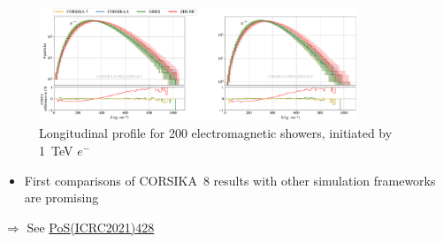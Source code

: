 \begin{frame}[c]
    \begin{figure}
        \centering
        \includegraphics[width=0.85\textwidth]{plots/longitudinal_profile.pdf}
        \caption*{Longitudinal profile for 200 electromagnetic showers, initiated by \SI{1}{\tera\electronvolt} $e^-$}
    \end{figure}
    \begin{itemize}
        \item First comparisons of CORSIKA~8 results with other simulation frameworks are promising
    \end{itemize}

    \hspace{20pt} $\Rightarrow$ See \href{https://pos.sissa.it/395/428/}{PoS(ICRC2021)428}

\end{frame}



